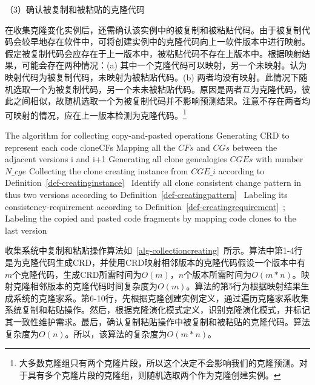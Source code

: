 （3）确认被复制和被粘贴的克隆代码

在收集克隆变化实例后，还需确认该实例中的被复制和被粘贴代码。由于被复制代码会较早地存在软件中，可将创建实例中的克隆代码向上一软件版本中进行映射。假定被复制代码会应存在于上一版本中，被粘贴代码不存在上版本中。根据映射结果，可能会存在两种情况：(a) 其中一个克隆代码可以映射，另一个未映射。认为映射代码为被复制代码，未映射为被粘贴代码。(b) 两者均没有映射。此情况下随机选取一个为被复制代码，另一个未未被粘贴代码。原因是两者互为克隆代码，彼此之间相似，故随机选取一个为被复制代码并不影响预测结果。注意不存在两者均可映射的情况，应在上一版本检测为克隆代码。\footnote{大多数克隆组只有两个克隆片段，所以这个决定不会影响我们的克隆预测。对于具有多个克隆片段的克隆组，则随机选取两个作为克隆创建实例。}

\begin{minipage}{0.8\textwidth}
\centering
\begin{algorithm}[H]
 {The algorithm for collecting copy-and-pasted operations}
\label{alg-collectioncreating}
{ 
 Generating CRD to represent each code clone{CFs}\;
 Mapping all the $CFs$ and $CGs$ between the adjacent versions {i} and {i+1}\;
}
Generating all clone genealogies $CGEs$ with number $N\_cge$\;
{ 
 Collecting the clone creating instance from $CGE\_i$ according to Definition~\ref{def-creatinginstance}~\; 
 Identify all clone consistent change pattern in thus two versions according to Definition~\ref{def-creatingpattern}~\;
 Labeling its consistency-requirement according to Definition~\ref{def-creatingrequirement}~; 
 Labeling the copied and pasted code fragments by mapping code clones to the last version\;
}
\end{algorithm}
\end{minipage}

收集系统中复制和粘贴操作算法如~\ref{alg-collectioncreating}~所示。算法中第1-4行是为克隆代码生成CRD，并使用CRD映射相邻版本的克隆代码假设一个版本中有$m$个克隆代码，生成CRD所需时间为$O(m)$，$n$个版本所需时间为$O(m*n)$。映射克隆相邻版本的克隆代码时间复杂度为$O(m)$。算法的第5行为根据映射结果生成系统的克隆家系。第6-10行，先根据克隆创建实例定义，通过遍历克隆家系收集系统复制和粘贴操作。然后，根据克隆演化模式定义，识别克隆演化模式，并标记其一致性维护需求。最后，确认复制粘贴操作中被复制和被粘贴的克隆代码。算法复杂度为$O(n)$。所以，该算法的复杂度为$O(m*n)$。

